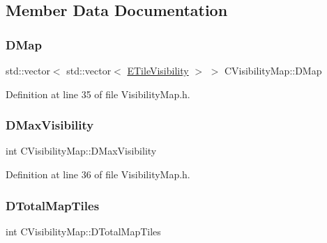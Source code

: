 \subsection{Member Data Documentation}
\hypertarget{classCVisibilityMap_ad217bc34f7a50dd357a3eeeb69cfdd85}{}\label{classCVisibilityMap_ad217bc34f7a50dd357a3eeeb69cfdd85} 
\subsubsection{\texorpdfstring{D\+Map}{DMap}}
{\footnotesize\ttfamily std\+::vector$<$ std\+::vector$<$ \hyperlink{classCVisibilityMap_a6665f905da08825adbb0eee7bd1f2f30}{E\+Tile\+Visibility} $>$ $>$ C\+Visibility\+Map\+::\+D\+Map\hspace{0.3cm}{\ttfamily [protected]}}



Definition at line 35 of file Visibility\+Map.\+h.

\hypertarget{classCVisibilityMap_ac8f71b9541c903fce0294d75daa1bbb1}{}\label{classCVisibilityMap_ac8f71b9541c903fce0294d75daa1bbb1} 
\subsubsection{\texorpdfstring{D\+Max\+Visibility}{DMaxVisibility}}
{\footnotesize\ttfamily int C\+Visibility\+Map\+::\+D\+Max\+Visibility\hspace{0.3cm}{\ttfamily [protected]}}



Definition at line 36 of file Visibility\+Map.\+h.

\hypertarget{classCVisibilityMap_a9bd6e633268535677aeefbd886c29485}{}\label{classCVisibilityMap_a9bd6e633268535677aeefbd886c29485} 
\subsubsection{\texorpdfstring{D\+Total\+Map\+Tiles}{DTotalMapTiles}}
{\footnotesize\ttfamily int C\+Visibility\+Map\+::\+D\+Total\+Map\+Tiles\hspace{0.3cm}{\ttfamily [protected]}}



